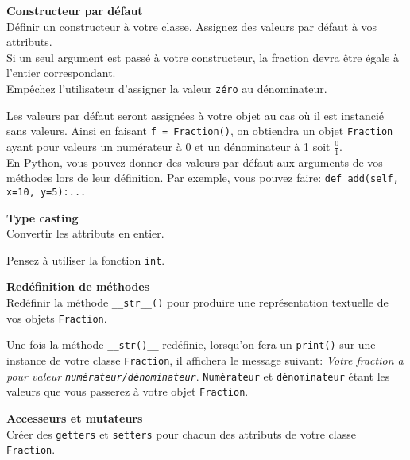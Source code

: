 \begin{Exercice}[5 minutes] \textbf{Constructeur par défaut} \\
Définir un constructeur à votre classe. Assignez des valeurs par défaut à vos attributs. \\
Si un seul argument est passé à votre constructeur, la fraction devra être égale à l'entier correspondant.\\
Empêchez l'utilisateur d'assigner la valeur \lstinline{zéro} au dénominateur.

    \begin{conseil}
		Les valeurs par défaut seront assignées à votre objet au cas où il est instancié sans valeurs. Ainsi en faisant \lstinline{f = Fraction()}, on obtiendra un objet \lstinline{Fraction} ayant pour valeurs un numérateur à 0 et un dénominateur à 1 soit $\frac{0}{1}$.\\
		En Python, vous pouvez donner des valeurs par défaut aux arguments de vos méthodes lors de leur définition. Par exemple, vous pouvez faire: 
			\lstinline{def add(self, x=10, y=5):...}
    \end{conseil}
\end{Exercice}

\begin{Exercice}[5 minutes] \textbf{Type casting}\\
	Convertir les attributs en entier.
	\begin{conseil}
		Pensez à utiliser la fonction \lstinline{int}.
	\end{conseil}
\end{Exercice}

\begin{Exercice}[5 minutes] \textbf{Redéfinition de méthodes} \\
	Redéfinir la méthode \lstinline{__str__()} pour produire une représentation textuelle de vos objets \lstinline{Fraction}.
	\begin{conseil}
		Une fois la méthode \lstinline{__str()__} redéfinie, lorsqu'on fera un \lstinline{print()} sur une instance de votre classe \lstinline{Fraction}, il affichera le message suivant: \textit{Votre fraction a pour valeur \lstinline{numérateur/dénominateur}}. \lstinline{Numérateur} et \lstinline{dénominateur} étant les valeurs que vous passerez à votre objet \lstinline{Fraction}.
	\end{conseil}
\end{Exercice}

\begin{Exercice} [5 minutes] \textbf{Accesseurs et mutateurs} \\
	Créer des \lstinline{getters} et \lstinline{setters} pour chacun des attributs de votre classe \lstinline{Fraction}.
\end{Exercice}


